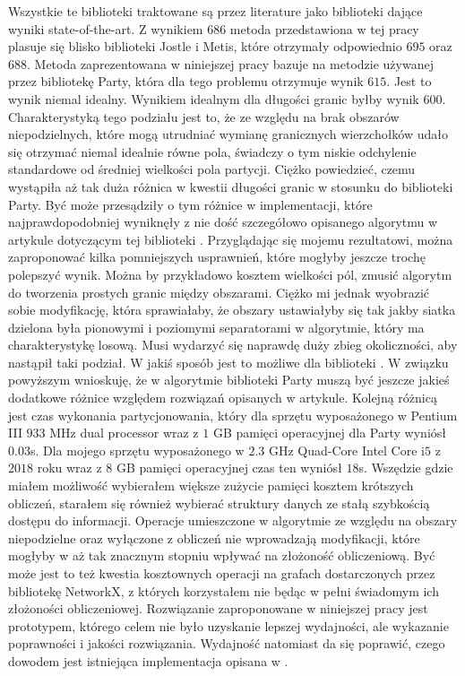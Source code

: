 Wszystkie te biblioteki traktowane są przez literature jako biblioteki dające wyniki state-of-the-art.
Z wynikiem $686$ metoda przedstawiona w tej pracy plasuje się blisko biblioteki Jostle i Metis,
które otrzymały odpowiednio $695$ oraz $688$.
Metoda zaprezentowana w niniejszej pracy bazuje na metodzie używanej przez bibliotekę Party, która dla tego problemu
otrzymuje wynik $615$.
Jest to wynik niemal idealny.
Wynikiem idealnym dla długości granic byłby wynik $600$.
Charakterystyką tego podziału jest to, że ze względu na brak obszarów niepodzielnych, które mogą utrudniać
wymianę granicznych wierzchołków udało się otrzymać niemal idealnie równe pola, świadczy o tym niskie odchylenie
standardowe od średniej wielkości pola partycji.
Ciężko powiedzieć, czemu wystąpiła aż tak duża różnica w kwestii długości granic w stosunku do biblioteki Party.
Być może przesądziły o tym różnice w implementacji, które najprawdopodobniej wyniknęły z nie dość szczegółowo opisanego algorytmu
w artykule dotyczącym tej biblioteki \cite{1364754}.
Przyglądając się mojemu rezultatowi, można zaproponować kilka pomniejszych usprawnień, które mogłyby jeszcze trochę polepszyć wynik.
Można by przykładowo kosztem wielkości pól, zmusić algorytm do tworzenia prostych granic między obszarami.
Ciężko mi jednak wyobrazić sobie modyfikację, która sprawiałaby, że obszary ustawiałyby się tak jakby siatka dzielona
była pionowymi i poziomymi separatorami w algorytmie, który ma charakterystykę losową.
Musi wydarzyć się naprawdę duży zbieg okoliczności, aby nastąpił taki podział.
W jakiś sposób jest to możliwe dla biblioteki \cite{1364754}.
W związku powyższym wnioskuję, że w algorytmie biblioteki Party \cite{1364754} muszą być jeszcze jakieś dodatkowe
różnice względem rozwiązań opisanych w artykule.
Kolejną różnicą jest czas wykonania partycjonowania, który dla sprzętu wyposażonego w Pentium III $933$ MHz dual processor
wraz z $1$ GB pamięci operacyjnej dla Party wyniósł $0.03$s.
Dla mojego sprzętu wyposażonego w $2.3$ GHz Quad-Core Intel Core i$5$ z $2018$ roku wraz z $8$ GB pamięci operacyjnej
czas ten wyniósł $18$s.
Wszędzie gdzie miałem możliwość wybierałem większe zużycie pamięci kosztem krótszych obliczeń, starałem się również
wybierać struktury danych ze stałą szybkością dostępu do informacji.
Operacje umieszczone w algorytmie ze względu na obszary niepodzielne oraz wyłączone z obliczeń nie wprowadzają
modyfikacji, które mogłyby w aż tak znacznym stopniu wpływać na złożoność obliczeniową.
Być może jest to też kwestia kosztownych operacji na grafach dostarczonych przez bibliotekę NetworkX,
z których korzystałem nie będąc w pełni świadomym ich złożoności obliczeniowej.
Rozwiązanie zaproponowane w niniejszej pracy jest prototypem, którego celem
nie było uzyskanie lepszej wydajności, ale wykazanie poprawności i jakości rozwiązania.
Wydajność natomiast da się poprawić, czego dowodem jest istniejąca implementacja opisana w \cite{1364754}.

